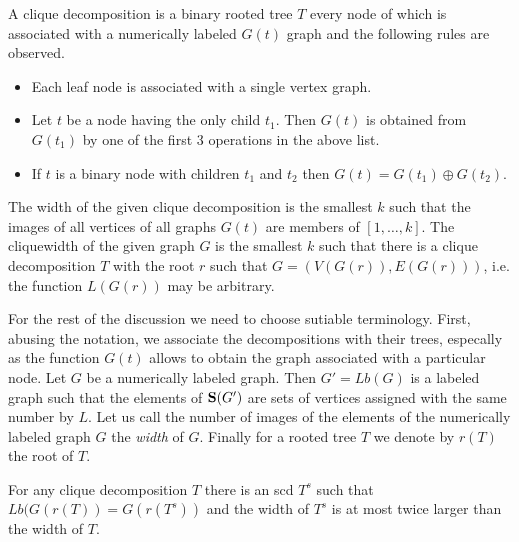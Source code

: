 \documentclass{llncs}
\begin{document}
A clique decomposition is a binary rooted tree $T$ every node of which is 
associated with a numerically labeled $G(t)$ graph and the following rules are observed.
\begin{itemize}
\item Each leaf node is associated with a single vertex graph.
\item Let $t$ be a node having the only child $t_1$. Then $G(t)$ is obtained
from $G(t_1)$ by one of the first $3$ operations in the above list.
\item If $t$ is a binary node with children $t_1$ and $t_2$ then $G(t)=G(t_1) \oplus G(t_2)$.
\end{itemize}

The width of the given clique decomposition is the smallest $k$ such that the images
of all vertices of all graphs $G(t)$ are members of $[1, \dots,k]$.
The cliquewidth of the given graph $G$ is the smallest $k$ such that there is a clique
decomposition $T$ with the root $r$ such that $G=(V(G(r)),E(G(r)))$, i.e. the function
$L(G(r))$ may be arbitrary.


For the rest of the discussion we need to choose sutiable terminology.
First, abusing the notation, we associate the decompositions with their trees,
especally as the function $G(t)$ allows to obtain the graph associated with 
a particular node. Let $G$ be a numerically labeled graph. Then $G'=Lb(G)$ 
is a labeled graph such that the elements of ${\bf S}(G')$ are sets of vertices assigned
with the same number by $L$. Let us call the number of images of the elements of the
numerically labeled graph $G$ the \emph{width} of $G$. Finally for a rooted tree $T$ we denote by
$r(T)$ the root of $T$.   

\begin{lemma} \label{widthrelation}
For any clique decomposition $T$ there is an {\sc scd} $T^s$ such that 
$Lb(G(r(T))=G(r(T^s))$ and the width of $T^s$ is at most twice larger
than the width of $T$.
\end{lemma}
\end{document}
